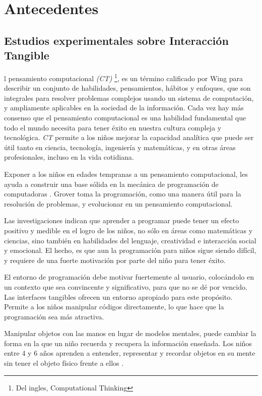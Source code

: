 \chapter{Antecedentes}
\label{chap:antecedentes}
\section{Estudios experimentales sobre Interacción Tangible}


l pensamiento computacional \emph{(CT)} \footnote{Del ingles, Computational Thinking}, es un término calificado por Wing \cite{Wing} para describir un conjunto de habilidades, pensamientos, hábitos y enfoques, que son integrales para resolver problemas complejos usando un sistema de computación, y ampliamente aplicables en la sociedad de la información. Cada vez hay más consenso que el pensamiento computacional es una habilidad fundamental que todo el mundo necesita para tener éxito en nuestra cultura compleja y tecnológica. \emph{CT} permite a los niños mejorar la capacidad analítica que puede ser útil tanto en ciencia, tecnología, ingeniería y matemáticas, y en otras áreas profesionales, incluso en la vida cotidiana. 

Exponer a los niños en edades tempranas a un pensamiento computacional, les ayuda a construir una base sólida en la mecánica de programación de computadoras \cite{Grover}. Grover toma la programación, como una manera útil para la resolución de problemas, y evolucionar en un pensamiento computacional. 

Las investigaciones indican que aprender a programar puede tener un efecto positivo y medible en el logro de los niños, no sólo en áreas como matemáticas y ciencias, sino también en habilidades del lenguaje, creatividad e interacción social y emocional. El hecho, es que aun la programación para niños sigue siendo difícil, y requiere de una fuerte motivación por parte del niño para tener éxito.

El entorno de programación debe motivar fuertemente al usuario, colocándolo en un contexto que sea convincente y significativo, para que no se dé por vencido. Las interfaces tangibles ofrecen un entorno apropiado para este propósito. Permite a los niños manipular códigos directamente, lo que hace que la programación sea más atractiva. 

Manipular objetos con las manos en lugar de modelos mentales, puede cambiar la forma en la que un niño recuerda y recupera la información enseñada. Los niños entre 4 y 6 años aprenden a entender, representar y recordar objetos en su mente sin tener el objeto físico frente a ellos \cite{Piaget}.

